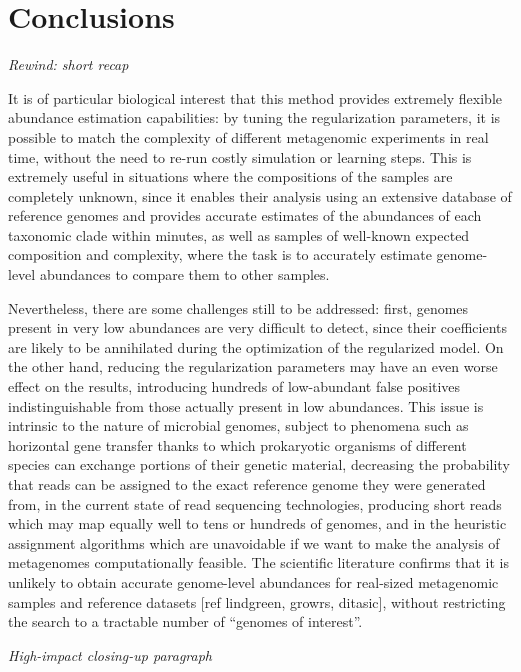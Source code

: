 
\chapter{Conclusions} %
\label{Chapter5}

\textit{Rewind: short recap}

It is of particular biological interest that this method provides extremely flexible abundance estimation capabilities: by tuning the regularization parameters, it is possible to match the complexity of different metagenomic experiments in real time, without the need to re-run costly simulation or learning steps. This is extremely useful in situations where the compositions of the samples are completely unknown, since it enables their analysis using an extensive database of reference genomes and provides accurate estimates of the abundances of each taxonomic clade within minutes, as well as samples of well-known expected composition and complexity, where the task is to accurately estimate genome-level abundances to compare them to other samples.

Nevertheless, there are some challenges still to be addressed: first, genomes present in very low abundances are very difficult to detect, since their coefficients are likely to be annihilated during the optimization of the regularized model. On the other hand, reducing the regularization parameters may have an even worse effect on the results, introducing hundreds of low-abundant false positives indistinguishable from those actually present in low abundances. This issue is intrinsic to the nature of microbial genomes, subject to phenomena such as horizontal gene transfer thanks to which prokaryotic organisms of different species can exchange portions of their genetic material, decreasing the probability that reads can be assigned to the exact reference genome they were generated from, in the current state of read sequencing technologies, producing short reads which may map equally well to tens or hundreds of genomes, and in the heuristic assignment algorithms which are unavoidable if we want to make the analysis of metagenomes computationally feasible. The scientific literature confirms that it is unlikely to obtain accurate genome-level abundances for real-sized metagenomic samples and reference datasets [ref lindgreen, growrs, ditasic], without restricting the search to a tractable number of ``genomes of interest''.

\textit{High-impact closing-up paragraph}

